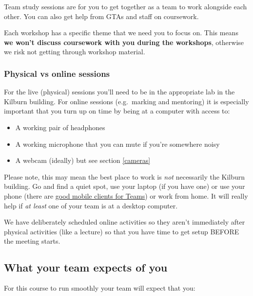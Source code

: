 \documentclass[
]{book}
\providecommand{\tightlist}{%
  \setlength{\itemsep}{0pt}\setlength{\parskip}{0pt}}
\begin{document}
Team study sessions are for you to get together as a team to work alongside each other. You can also get help from GTAs and staff on coursework.

Each workshop has a specific theme that we need you to focus on. This means \textbf{we won't discuss coursework with you during the workshops}, otherwise we risk not getting through workshop material.

\hypertarget{online}{%
\subsubsection{Physical vs online sessions}\label{online}}

For the live (physical) sessions you'll need to be in the appropriate lab in the Kilburn building. For online sessions (e.g.~marking and mentoring) it is especially important that you turn up on time by being at a computer with access to:

\begin{itemize}
\tightlist
\item
  A working pair of headphones
\item
  A working microphone that you can mute if you're somewhere noisy
\item
  A webcam (ideally) but see section \ref{cameras}
\end{itemize}

Please note, this may mean the best place to work is \emph{not} necessarily the Kilburn building. Go and find a quiet spot, use your laptop (if you have one) or use your phone (there are \href{https://www.microsoft.com/en-gb/microsoft-teams/download-app}{good mobile clients for Teams}) or work from home. It will really help if \emph{at least} one of your team is at a desktop computer.

We have deliberately scheduled online activities so they aren't immediately after physical activities (like a lecture) so that you have time to get setup BEFORE the meeting starts.

\hypertarget{urteam}{%
\subsection{What your team expects of you}\label{urteam}}

For this course to run smoothly your team will expect that you:
\end{document}
